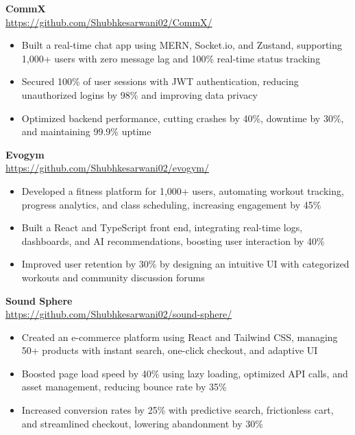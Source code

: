 \documentclass[a4paper]{article}
\begin{document}
{\textbf{CommX}}\\
\vspace{-1mm}
\url{https://github.com/Shubhkesarwani02/CommX/} \\
\vspace{-2mm}
\begin{itemize}  
\item Built a real-time chat app using MERN, Socket.io, and Zustand, supporting 1,000+ users with zero message lag and 100\% real-time status tracking 
\item Secured 100\% of user sessions with JWT authentication, reducing unauthorized logins by 98\% and improving data privacy
\item Optimized backend performance, cutting crashes by 40\%, downtime by 30\%, and maintaining 99.9\% uptime  
\end{itemize}
{\textbf{Evogym}}\\
\vspace{-1mm}
\url{https://github.com/Shubhkesarwani02/evogym/}\\
\vspace{-2mm}
\begin{itemize}  
\item Developed a fitness platform for 1,000+ users, automating workout tracking, progress analytics, and class scheduling, increasing engagement by 45\%
\item Built a React and TypeScript front end, integrating real-time logs, dashboards, and AI recommendations, boosting user interaction by 40\% 
\item Improved user retention by 30\% by designing an intuitive UI with categorized workouts and community discussion forums 
\end{itemize}  
{\textbf{Sound Sphere}}\\
\vspace{-1mm}
\url{https://github.com/Shubhkesarwani02/sound-sphere/} \\
\vspace{-2mm}
\begin{itemize}  
\item Created an e-commerce platform using React and Tailwind CSS, managing 50+ products with instant search, one-click checkout, and adaptive UI
\item Boosted page load speed by 40\% using lazy loading, optimized API calls, and asset management, reducing bounce rate by 35\%
\item Increased conversion rates by 25\% with predictive search, frictionless cart, and streamlined checkout, lowering abandonment by 30\%  
\end{itemize} 
\end{document}
